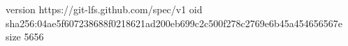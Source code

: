 version https://git-lfs.github.com/spec/v1
oid sha256:04ae5f607238688f0218621ad200eb699c2c500f278c2769e6b45a454656567e
size 5656

